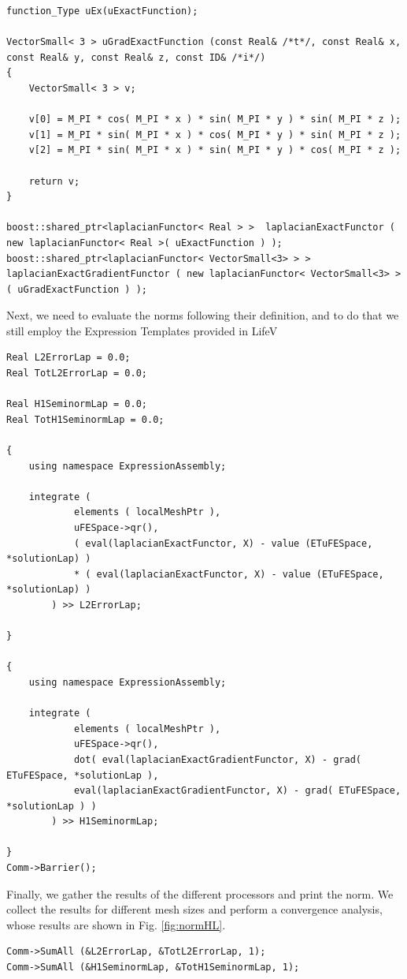 \begin{itemize}
\begin{lstlisting}
function_Type uEx(uExactFunction);

VectorSmall< 3 > uGradExactFunction (const Real& /*t*/, const Real& x, const Real& y, const Real& z, const ID& /*i*/)
{
    VectorSmall< 3 > v;
    
    v[0] = M_PI * cos( M_PI * x ) * sin( M_PI * y ) * sin( M_PI * z );
    v[1] = M_PI * sin( M_PI * x ) * cos( M_PI * y ) * sin( M_PI * z );
    v[2] = M_PI * sin( M_PI * x ) * sin( M_PI * y ) * cos( M_PI * z );
    
    return v;
}

boost::shared_ptr<laplacianFunctor< Real > >  laplacianExactFunctor ( new laplacianFunctor< Real >( uExactFunction ) );
boost::shared_ptr<laplacianFunctor< VectorSmall<3> > >  laplacianExactGradientFunctor ( new laplacianFunctor< VectorSmall<3> >( uGradExactFunction ) );
\end{lstlisting}
Next, we need to evaluate the norms following their definition, and to do that we still employ the Expression Templates provided in LifeV
\begin{lstlisting}
Real L2ErrorLap = 0.0;
Real TotL2ErrorLap = 0.0;

Real H1SeminormLap = 0.0;
Real TotH1SeminormLap = 0.0;

{
    using namespace ExpressionAssembly;

    integrate (
            elements ( localMeshPtr ),
            uFESpace->qr(),
            ( eval(laplacianExactFunctor, X) - value (ETuFESpace, *solutionLap) )
            * ( eval(laplacianExactFunctor, X) - value (ETuFESpace, *solutionLap) )
        ) >> L2ErrorLap;

}

{
    using namespace ExpressionAssembly;
    
    integrate (
            elements ( localMeshPtr ),
            uFESpace->qr(),
            dot( eval(laplacianExactGradientFunctor, X) - grad( ETuFESpace, *solutionLap ),
            eval(laplacianExactGradientFunctor, X) - grad( ETuFESpace, *solutionLap ) )
        ) >> H1SeminormLap;
 
}
Comm->Barrier();
\end{lstlisting}
Finally, we gather the results of the different processors and print the norm. We collect the results for different mesh sizes and perform a convergence analysis, whose results are shown in Fig. \ref{fig:normHL}.
\begin{lstlisting}
Comm->SumAll (&L2ErrorLap, &TotL2ErrorLap, 1);
Comm->SumAll (&H1SeminormLap, &TotH1SeminormLap, 1);


\end{lstlisting}
\end{itemize}

